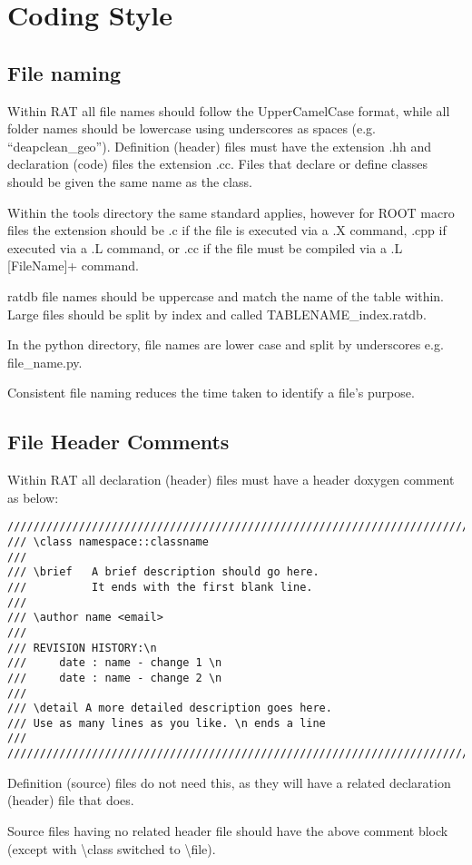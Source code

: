 \section{Coding Style}
\subsection{File naming}
Within RAT all file names should follow the UpperCamelCase format, while all folder names should be lowercase using underscores as spaces (e.g. ``deapclean\_geo''). Definition (header) files must have the extension .hh and declaration (code) files the extension .cc. Files that declare or define classes should be given the same name as the class.

Within the tools directory the same standard applies, however for ROOT macro files the extension should be .c if the file is executed via a .X command, .cpp if executed via a .L command, or .cc if the file must be compiled via a .L [FileName]+ command.

ratdb file names should be uppercase and match the name of the table within. Large files should be split by index and called TABLENAME\_index.ratdb.

In the python directory, file names are lower case and split by underscores e.g. file\_name.py.

Consistent file naming reduces the time taken to identify a file's purpose. 

\subsection{File Header Comments}
Within RAT all declaration (header) files must have a header doxygen comment as below:
\begin{verbatim}
////////////////////////////////////////////////////////////////////////
/// \class namespace::classname
///
/// \brief   A brief description should go here.
///          It ends with the first blank line.
///
/// \author name <email>
///
/// REVISION HISTORY:\n
///     date : name - change 1 \n
///     date : name - change 2 \n
///
/// \detail A more detailed description goes here.
/// Use as many lines as you like. \n ends a line
///
////////////////////////////////////////////////////////////////////////
\end{verbatim}
Definition (source) files do not need this, as they will have a related declaration (header) file that does.

Source files having no related header file should have the above comment block (except with \textbackslash class switched to \textbackslash file).

